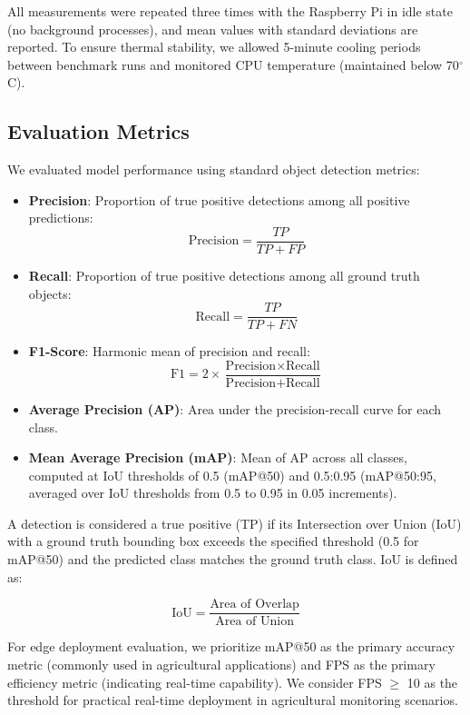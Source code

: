 All measurements were repeated three times with the Raspberry Pi in idle state (no background processes), and mean values with standard deviations are reported. To ensure thermal stability, we allowed 5-minute cooling periods between benchmark runs and monitored CPU temperature (maintained below 70$^\circ$C).

\subsection{Evaluation Metrics}

We evaluated model performance using standard object detection metrics:

\begin{itemize}
\item \textbf{Precision}: Proportion of true positive detections among all positive predictions:
\begin{equation}
\text{Precision} = \frac{TP}{TP + FP}
\end{equation}

\item \textbf{Recall}: Proportion of true positive detections among all ground truth objects:
\begin{equation}
\text{Recall} = \frac{TP}{TP + FN}
\end{equation}

\item \textbf{F1-Score}: Harmonic mean of precision and recall:
\begin{equation}
\text{F1} = 2 \times \frac{\text{Precision} \times \text{Recall}}{\text{Precision} + \text{Recall}}
\end{equation}

\item \textbf{Average Precision (AP)}: Area under the precision-recall curve for each class.

\item \textbf{Mean Average Precision (mAP)}: Mean of AP across all classes, computed at IoU thresholds of 0.5 (mAP@50) and 0.5:0.95 (mAP@50:95, averaged over IoU thresholds from 0.5 to 0.95 in 0.05 increments).
\end{itemize}

A detection is considered a true positive (TP) if its Intersection over Union (IoU) with a ground truth bounding box exceeds the specified threshold (0.5 for mAP@50) and the predicted class matches the ground truth class. IoU is defined as:

\begin{equation}
\text{IoU} = \frac{\text{Area of Overlap}}{\text{Area of Union}}
\end{equation}

For edge deployment evaluation, we prioritize mAP@50 as the primary accuracy metric (commonly used in agricultural applications) and FPS as the primary efficiency metric (indicating real-time capability). We consider FPS $\geq$ 10 as the threshold for practical real-time deployment in agricultural monitoring scenarios.
